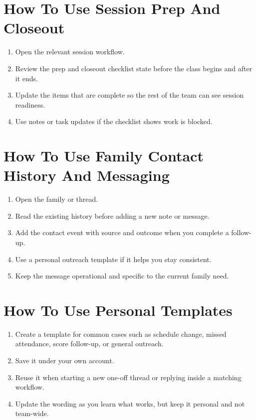 \documentclass[11pt]{article}
\begin{document}
\section*{How To Use Session Prep And Closeout}
\begin{enumerate}
  \item Open the relevant session workflow.
  \item Review the prep and closeout checklist state before the class begins and after it ends.
  \item Update the items that are complete so the rest of the team can see session readiness.
  \item Use notes or task updates if the checklist shows work is blocked.
\end{enumerate}

\section*{How To Use Family Contact History And Messaging}
\begin{enumerate}
  \item Open the family or thread.
  \item Read the existing history before adding a new note or message.
  \item Add the contact event with source and outcome when you complete a follow-up.
  \item Use a personal outreach template if it helps you stay consistent.
  \item Keep the message operational and specific to the current family need.
\end{enumerate}

\section*{How To Use Personal Templates}
\begin{enumerate}
  \item Create a template for common cases such as schedule change, missed attendance, score follow-up, or general outreach.
  \item Save it under your own account.
  \item Reuse it when starting a new one-off thread or replying inside a matching workflow.
  \item Update the wording as you learn what works, but keep it personal and not team-wide.
\end{enumerate}
\end{document}

